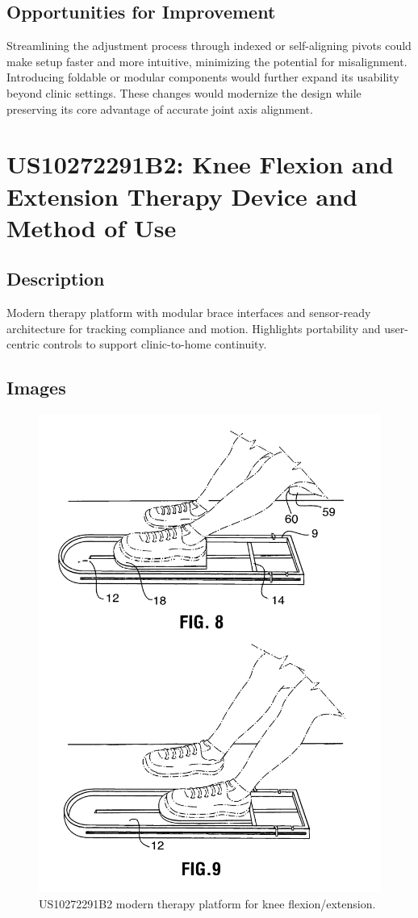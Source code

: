 \documentclass[11pt]{article}
\begin{document}
\subsection{Opportunities for Improvement}
Streamlining the adjustment process through indexed or self-aligning pivots could make setup faster and more intuitive, minimizing the potential for misalignment. Introducing foldable or modular components would further expand its usability beyond clinic settings. These changes would modernize the design while preserving its core advantage of accurate joint axis alignment.

\section{US10272291B2: Knee Flexion and Extension Therapy Device and Method of Use}
\subsection{Description}
Modern therapy platform with modular brace interfaces and sensor-ready architecture for tracking compliance and motion. Highlights portability and user-centric controls to support clinic-to-home continuity.
\subsection{Images}
\begin{figure}[H]
  \centering
  \includegraphics[width=0.54\linewidth]{10272291B2_1.png}
  \caption{US10272291B2 modern therapy platform for knee flexion/extension.}
  \label{fig:US10272291B2}
\end{figure}
\end{document}
